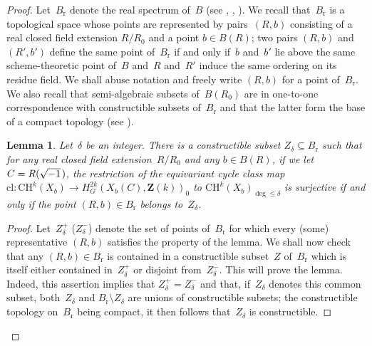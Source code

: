 \documentclass[JEP,XML,SOM,Unicode]{cedram}
\theoremstyle{plain}
\newtheorem{lem}[thm]{Lemma}
\theoremstyle{definition}
\numberwithin{equation}{section}
\newcommand{\cl}{{\mathrm{cl}}}
\newcommand{\rs}{{\mathrm{r}}}
\newcommand{\Z}{{\mathbf Z}}
\newcommand{\CH}{\mathrm{CH}}
\begin{document}
\begin{proof}
Let~$B_\rs$ denote the real spectrum of~$B$ (see \cite{costeroyspectrereel},
\cite[Ch.\,7]{bcr},
\cite[(0.4)]{scheiderer}).
We recall that~$B_\rs$ is a topological space whose points are represented by
pairs~$(R,b)$ consisting of a real closed field extension $R/R_0$ and a point $b \in B(R)$;
two pairs $(R,b)$ and $(R',b')$ define the same point of~$B_\rs$ if and only if~$b$ and~$b'$ lie above
the same scheme-theoretic point of~$B$ and~$R$ and~$R'$ induce the same ordering on its residue field.
We shall abuse notation and freely write $(R,b)$ for a point of~$B_\rs$.
We also recall that
semi-algebraic subsets of~$B(R_0)$ are in one-to-one correspondence with constructible subsets of~$B_\rs$
and that the latter form the base of a compact topology (see \cite[Prop.\,7.1.12, Theorem~7.2.3]{bcr}).

\begin{lem}
\label{lem:constructibility of algebraicity degree delta}
Let~$\delta$ be an integer.
There is a constructible subset $Z_\delta \subseteq B_\rs$
such that for any real closed field extension~$R/R_0$
and any $b \in B(R)$,
if we let $C=R(\sqrt{-1}\mkern2mu)$,
the restriction
of the equivariant cycle class map
$\cl:\CH^k(X_b) \to H^{2k}_G(X_b(C),\Z(k))_0$
to $\CH^k(X_b)_{\deg\leq\delta}$
is surjective
if and only if
the point $(R,b) \in B_\rs$ belongs to~$Z_\delta$.
\end{lem}

\begin{proof}
Let~$Z_\delta^+$
(\resp $Z_\delta^-$)
denote the set of points of~$B_\rs$ for which every (\resp some)
representative $(R,b)$ satisfies the property of the lemma.
We shall now check that any $(R,b) \in B_\rs$
is contained in a constructible subset~$Z$ of~$B_\rs$
which is itself either contained in~$Z_\delta^+$ or disjoint from~$Z_\delta^-$.
This will prove the lemma. Indeed, this assertion implies that $Z_\delta^+=Z_\delta^-$ and that,
if~$Z_\delta$ denotes this common subset,
both~$Z_\delta$ and $B_\rs \setminus Z_\delta$ are unions of constructible subsets;
the constructible topology on~$B_\rs$ being compact, it then follows that~$Z_\delta$ is constructible.


\end{proof}
\end{proof}
\end{document}

